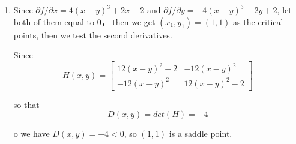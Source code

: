 \documentclass[11pt]{article}
\begin{document}
\begin{enumerate}
		\item Since $\partial f / \partial x = 4(x - y)^3 + 2x - 2$ and $\partial f / \partial y = -4(x - y)^3 - 2y + 2$, let both of them equal to $0$， then we get $(x_1, y_1) = (1, 1)$ as the critical points, then we test the second derivatives.
		
		Since
		\[H(x, y) = 
		\begin{bmatrix}
			12(x - y)^2 + 2 & -12(x - y)^2\\
			-12(x - y)^2 & 12(x - y)^2 - 2
		\end{bmatrix} \]
		
		so that
		\[D(x, y) = det(H) = -4\]
		
		o we have $D(x, y) = -4 < 0$, so $(1, 1)$ is a saddle point.
	\end{enumerate}
\end{document}
